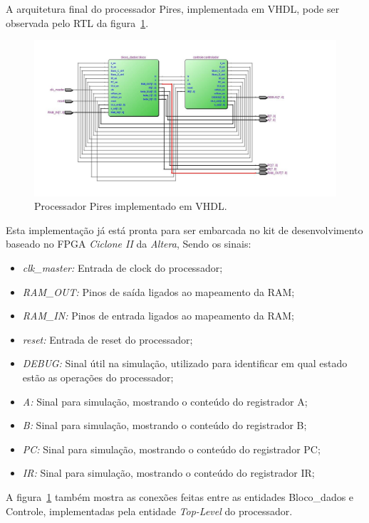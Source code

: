 \documentclass[../main.tex]{subfiles}
\begin{document}
	A arquitetura final do processador Pires, implementada em VHDL, pode ser observada pelo RTL da figura~\ref{fig:processador_RTL}.
	
	\begin{figure}[H]
		\centering
		\includegraphics[width=\textwidth]{img/processador_RTL}
		\caption{Processador Pires implementado em VHDL.}
		\label{fig:processador_RTL}
	\end{figure}
	
	Esta implementação já está pronta para ser embarcada no kit de desenvolvimento baseado no FPGA \textit{Ciclone II} da \textit{Altera},
	Sendo os sinais:
	\begin{itemize}
		\item \textit{clk\_master:} Entrada de clock do processador;
		\item \textit{RAM\_OUT:} Pinos de saída ligados ao mapeamento da RAM;		
		\item \textit{RAM\_IN:} Pinos de entrada ligados ao mapeamento da RAM;
		\item \textit{reset:} Entrada de reset do processador;
		\item \textit{DEBUG:} Sinal útil na simulação, utilizado para identificar em qual estado estão as operações do processador;		
		\item \textit{A:} Sinal para simulação, mostrando o conteúdo do registrador A;		
		\item \textit{B:} Sinal para simulação, mostrando o conteúdo do registrador B;		
		\item \textit{PC:} Sinal para simulação, mostrando o conteúdo do registrador PC;		
		\item \textit{IR:} Sinal para simulação, mostrando o conteúdo do registrador IR;
	\end{itemize}
	
	A figura~\ref{fig:processador_RTL} também mostra as conexões feitas entre as entidades Bloco\_dados e Controle, implementadas
	pela entidade \textit{Top-Level} do processador. 
\end{document}
